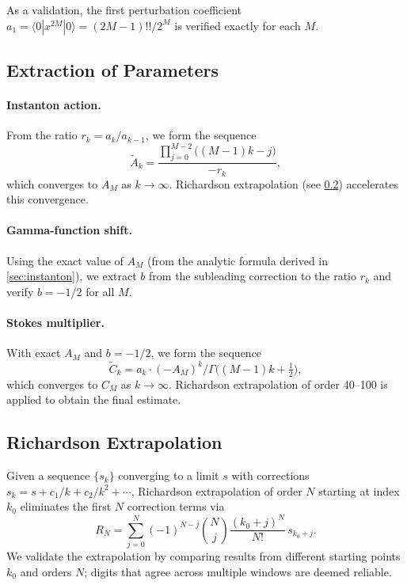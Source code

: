 \documentclass[12pt,a4paper]{article}
\numberwithin{equation}{section}
\theoremstyle{plain}
\theoremstyle{definition}
\theoremstyle{remark}
\begin{document}
As a validation, the first perturbation coefficient
$a_1 = \langle 0 | x^{2M} | 0 \rangle = (2M{-}1)!! / 2^M$ is verified
exactly for each $M$.

\subsection{Extraction of Parameters}
\label{sec:extraction}

\paragraph{Instanton action.}
From the ratio $r_k = a_k / a_{k-1}$, we form the sequence
\begin{equation}\label{eq:Ak-extraction}
  \widetilde{A}_k = \frac{\prod_{j=0}^{M-2}\bigl((M{-}1)k - j\bigr)}{-r_k},
\end{equation}
which converges to $A_M$ as $k \to \infty$. Richardson extrapolation
(see \cref{sec:richardson}) accelerates this convergence.

\paragraph{Gamma-function shift.}
Using the exact value of $A_M$ (from the analytic formula derived in
\cref{sec:instanton}), we extract $b$ from the subleading correction
to the ratio $r_k$ and verify $b = -1/2$ for all $M$.

\paragraph{Stokes multiplier.}
With exact $A_M$ and $b = -1/2$, we form the sequence
\begin{equation}\label{eq:Ck-extraction}
  \widetilde{C}_k = a_k \cdot (-A_M)^k \Big/ \Gamma\!\bigl((M{-}1)k + \tfrac{1}{2}\bigr),
\end{equation}
which converges to $C_M$ as $k \to \infty$. Richardson extrapolation of order
40--100 is applied to obtain the final estimate.

\subsection{Richardson Extrapolation}
\label{sec:richardson}

Given a sequence $\{s_k\}$ converging to a limit $s$ with corrections
$s_k = s + c_1/k + c_2/k^2 + \cdots$, Richardson extrapolation of order $N$
starting at index $k_0$ eliminates the first $N$ correction terms via
\begin{equation}\label{eq:richardson}
  R_N = \sum_{j=0}^{N} (-1)^{N-j} \binom{N}{j} \frac{(k_0+j)^N}{N!} \, s_{k_0+j}.
\end{equation}
We validate the extrapolation by comparing results from different starting
points $k_0$ and orders $N$; digits that agree across multiple windows are
deemed reliable.
\end{document}
